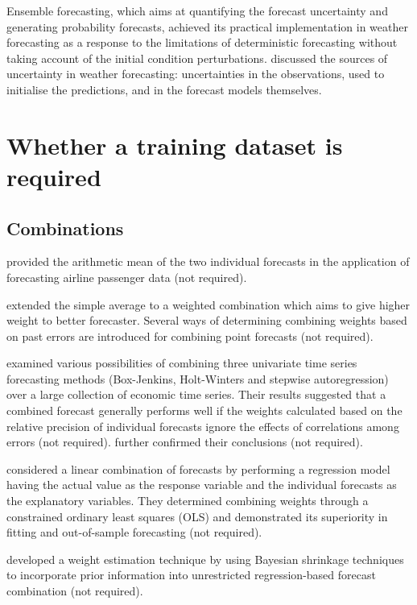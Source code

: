 \documentclass[11pt]{article}
\begin{document}
Ensemble forecasting, which aims at quantifying the forecast uncertainty and generating probability forecasts, achieved its practical implementation in weather forecasting as a response to the limitations of deterministic forecasting without taking account of the initial condition perturbations. \cite{leutbecher2008ensemble} discussed the sources of uncertainty in weather forecasting: uncertainties in the observations, used to initialise the predictions, and in the forecast models themselves.


\section{Whether a training dataset is required}

\subsection{Combinations}

\cite{barnard1963new} provided the arithmetic mean of the two individual forecasts in the application of forecasting airline passenger data (not required).

\cite{bates1969combination} extended the simple average to a weighted combination which aims to give higher weight to better forecaster. Several ways of determining combining weights based on past errors are introduced for combining point forecasts (not required).

\cite{newbold1974experience} examined various possibilities of combining three univariate time series forecasting methods (Box-Jenkins, Holt-Winters and stepwise autoregression) over a large collection of economic time series. Their results suggested that a combined forecast generally performs well if the weights calculated based on the relative precision of individual forecasts ignore the effects of correlations among errors (not required). \cite{winkler1983combination} further confirmed their conclusions (not required).

\cite{granger1984improved} considered a linear combination of forecasts by performing a regression model having the actual value as the response variable and the individual forecasts as the explanatory variables. They determined combining weights through a constrained ordinary least squares (OLS) and demonstrated its superiority in fitting and out-of-sample forecasting (not required).

\cite{diebold1990use} developed a weight estimation technique by using Bayesian shrinkage techniques to incorporate prior information into unrestricted regression-based forecast combination (not required).
\end{document}
